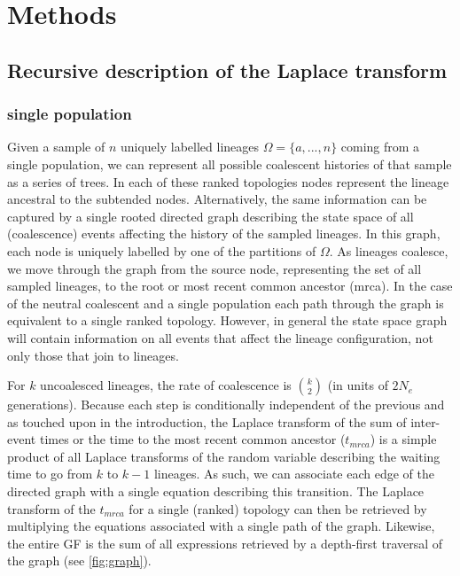 \documentclass[10pt, a4]{article}
\begin{document}
\section{Methods}
\subsection{Recursive description of the Laplace transform} \label{GF_description}
\subsubsection{single population}

Given a sample of $n$ uniquely labelled lineages $\Omega = \{a, ..., n\}$ coming from a single population, we can represent all possible coalescent histories of that sample as a series of trees. In each of these ranked topologies nodes represent the lineage ancestral to the subtended nodes. Alternatively, the same information can be captured by a single rooted directed graph describing the state space of all (coalescence) events affecting the history of the sampled lineages. In this graph, each node is uniquely labelled by one of the partitions of $\Omega$. As lineages coalesce, we move through the graph from the source node, representing the set of all sampled lineages, to the root or most recent common ancestor (mrca). In the case of the neutral coalescent and a single population each path through the graph is equivalent to a single ranked topology. However, in general the state space graph will contain information on all events that affect the lineage configuration, not only those that join to lineages. %

For $k$ uncoalesced lineages, the rate of coalescence is ${k}\choose{2}$ (in units of $2N_e$ generations). Because each step is conditionally independent of the previous and as touched upon in the introduction, the Laplace transform of the sum of inter-event times or the time to the most recent common ancestor ($t_{mrca}$) is a simple product of all Laplace transforms of the random variable describing the waiting time to go from $k$ to $k-1$ lineages. As such, we can associate each edge of the directed graph with a single equation describing this transition. The Laplace transform of the $t_{mrca}$ for a single (ranked) topology can then be retrieved by multiplying the equations associated with a single path of the graph. Likewise, the entire GF is the sum of all expressions retrieved by a depth-first traversal of the graph (see \ref{fig:graph}). %
\end{document}
